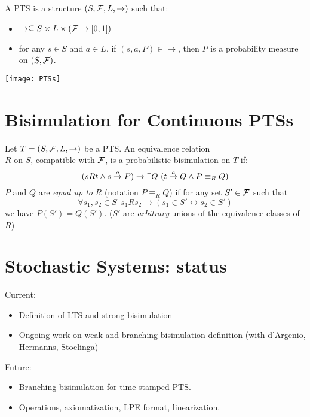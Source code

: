 \begin{slide}
A PTS is a structure $(S, {\cal F}, L, \to)$ such that:
\begin{itemize}
\item $\to\subseteq S\times L\times(\mathcal{F}\to[0,1])$
\item for any $s\in S$ and $a\in L$, if $(s,a,P)\in\to$, then $P$ is a probability measure on $(S,\mathcal{F})$.
\end{itemize}
\pause
\begin{center}
\texttt{[image: PTSs]}
\end{center}
\newslide\section*{Bisimulation for Continuous PTSs}
Let $T=(S,\mathcal{F}, L, \to)$ be a PTS. An equivalence relation\\
$R$ on $S$, compatible with $\mathcal{F}$, is a probabilistic bisimulation on $T$ if:
\[ (s R t\land s\stackrel{a}{\to} P) \to \exists Q~(t\stackrel{a}{\to} Q \land P \equiv_R Q) \]
\pause
$P$ and $Q$ are \emph{equal up to} $R$ (notation $P\equiv_R Q$) if 
for any set $S'\in\mathcal{F}$ such that 
\[\forall s_1,s_2\in S~~s_1 R s_2 \to (s_1\in S'\leftrightarrow s_2\in S')\]
we have $P(S')=Q(S')$. ($S'$ are \emph{arbitrary} unions of the equivalence classes of $R$)
\newslide\section*{Stochastic Systems: status}
Current:
\begin{itemize}
\item Definition of LTS and strong bisimulation 
\item Ongoing work on weak and branching bisimulation definition (with d'Argenio, Hermanns, Stoelinga)
\end{itemize}
\pause
Future:
\begin{itemize}
\item Branching bisimulation for time-stamped PTS.
\item Operations, axiomatization, LPE format, linearization.
\end{itemize}

\end{slide}
